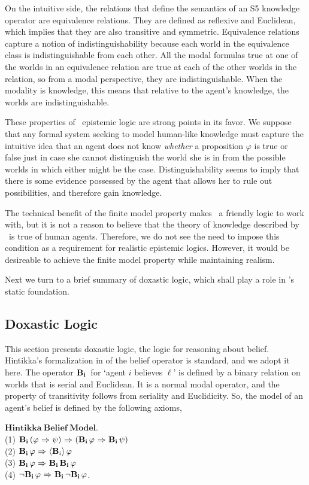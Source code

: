 On the intuitive side, the relations that define the semantics of an S5 knowledge operator are equivalence relations. They are defined as reflexive and Euclidean, which implies that they are also transitive and symmetric. Equivalence relations capture a notion of indistinguishability because each world in the equivalence class is indistinguishable from each other. All the modal formulas true at one of the worlds in an equivalence relation are true at each of the other worlds in the relation, so from a modal perspective, they are indistinguishable. When the modality is knowledge, this means that relative to the agent's knowledge, the worlds are indistinguishable. 

These properties of \SFive\ epistemic logic are strong points in its favor. We suppose that any formal system seeking to model human-like knowledge must capture the intuitive idea that an agent does not know \emph{whether} a proposition $\varphi$ is true or false just in case she cannot distinguish the world she is in from the possible worlds in which either might be the case. Distinguishability seems to imply that there is some evidence possessed by the agent that allows her to rule out possibilities, and therefore gain knowledge.

The technical benefit of the finite model property makes \SFive\ a friendly logic to work with, but it is not a reason to believe that the theory of knowledge described by \SFive\ is true of human agents. Therefore, we do not see the need to impose this condition as a requirement for realistic epistemic logics. However, it would be desireable to achieve the finite model property while maintaining realism.

Next we turn to a brief summary of doxastic logic, which shall play a role in \DASL's static foundation. 

\subsection{Doxastic Logic}
This section presents doxastic logic, the logic for reasoning about belief. Hintikka's formalization in \cite{Hintikka} of the belief operator is standard, and we adopt it here. The operator $\mathbf{B}_{\mathbf{i}}\,$ for `agent $i$ believes $\ell$' is defined by a binary relation on worlds that is serial and Euclidean. It is a normal modal operator, and the property of transitivity follows from seriality and Euclidicity. So, the model of an agent's belief is defined by the following axioms,

$\mathbf{Hintikka\ Belief\ Model}$.\\
(1) $\mathbf{B}_{\mathbf{i}}\,(\varphi {\ \Rightarrow \ } \psi) {\ \Rightarrow \ } (\mathbf{B}_{\mathbf{i}}\,\varphi {\ \Rightarrow \ } \mathbf{B}_{\mathbf{i}}\,\psi)$\\
(2) $\mathbf{B}_{\mathbf{i}}\,\varphi {\ \Rightarrow \ } \langle \mathbf{B}_{i} \rangle\,\varphi$\\
(3) $\mathbf{B}_{\mathbf{i}}\,\varphi {\ \Rightarrow \ } \mathbf{B}_{\mathbf{i}}\,\mathbf{B}_{\mathbf{i}}\,\varphi$\\
(4) ${\neg} \mathbf{B}_{\mathbf{i}}\,\varphi {\ \Rightarrow \ } \mathbf{B}_{\mathbf{i}}\,{\neg}\mathbf{B}_{\mathbf{i}}\,\varphi$.

